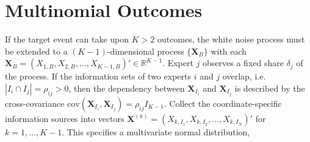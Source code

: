 \documentclass[11pt,twoside]{article}
\theoremstyle{definition}
\theoremstyle{definition}
\begin{document}
%


%


\section{Multinomial Outcomes}
If the target event can take upon $K > 2$ outcomes, the white noise process must be extended to a $(K-1)$-dimensional process $\{ \boldsymbol{X}_B \}$ with each $\boldsymbol{X}_B = (X_{1,B}, X_{2,B},  \dots, X_{K-1,B})' \in \mathbb{R}^{K-1}$.  Expert $j$ observes a fixed share $\delta_j$ of the process. If the information sets of two experts $i$ and $j$ overlap, i.e. $| I_i \cap I_j| = \rho_{ij} > 0$, then the dependency between $\boldsymbol{X}_{I_i}$ and $\boldsymbol{X}_{I_j}$ is described by the cross-covariance $\text{cov}(\boldsymbol{X}_{I_i}, \boldsymbol{X}_{I_j}) = \rho_{ij} I_{K-1}$. Collect the coordinate-specific information sources into vectors $\boldsymbol{X}^{(k)} = \left(X_{k,I_1}, X_{k,I_2}, \dots, X_{k,I_N} \right)'$  for $k = 1, \dots, K-1$. This specifies a multivariate normal distribution,
\end{document}

